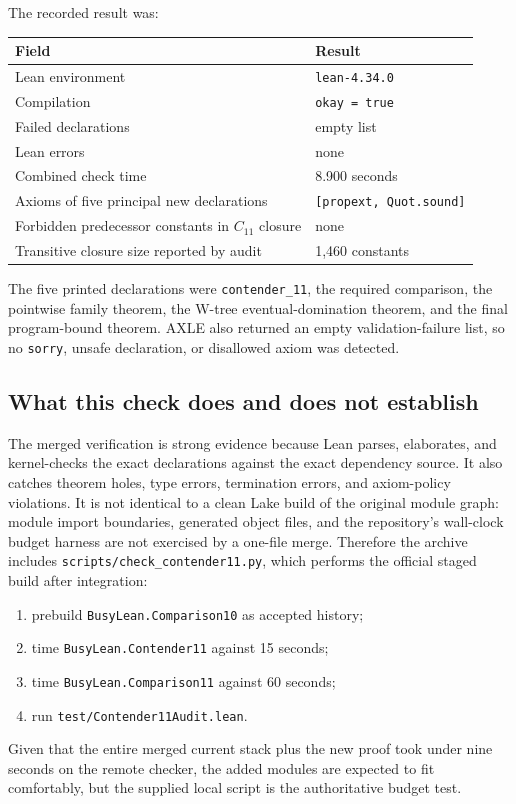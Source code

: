 \documentclass[11pt]{article}
\theoremstyle{definition}
\theoremstyle{remark}
\newcommand{\Celeven}{C_{11}}
\newcommand{\lean}[1]{\texttt{#1}}
\begin{document}
The recorded result was:
\begin{center}
\begin{tabular}{@{}ll@{}}
\toprule
Field & Result \\
\midrule
Lean environment & \lean{lean-4.34.0} \\
Compilation & \lean{okay = true} \\
Failed declarations & empty list \\
Lean errors & none \\
Combined check time & 8.900 seconds \\
Axioms of five principal new declarations & \lean{[propext, Quot.sound]} \\
Forbidden predecessor constants in $\Celeven$ closure & none \\
Transitive closure size reported by audit & 1,460 constants \\
\bottomrule
\end{tabular}
\end{center}

The five printed declarations were \lean{contender\_11}, the required comparison,
the pointwise family theorem, the W-tree eventual-domination theorem, and the
final program-bound theorem.  AXLE also returned an empty validation-failure
list, so no \lean{sorry}, unsafe declaration, or disallowed axiom was detected.

\subsection{What this check does and does not establish}

The merged verification is strong evidence because Lean parses, elaborates, and
kernel-checks the exact declarations against the exact dependency source.  It
also catches theorem holes, type errors, termination errors, and axiom-policy
violations.  It is not identical to a clean Lake build of the original module
graph: module import boundaries, generated object files, and the repository's
wall-clock budget harness are not exercised by a one-file merge.  Therefore the
archive includes \lean{scripts/check\_contender11.py}, which performs the official
staged build after integration:
\begin{enumerate}[leftmargin=*]
\item prebuild \lean{BusyLean.Comparison10} as accepted history;
\item time \lean{BusyLean.Contender11} against 15 seconds;
\item time \lean{BusyLean.Comparison11} against 60 seconds;
\item run \lean{test/Contender11Audit.lean}.
\end{enumerate}
Given that the entire merged current stack plus the new proof took under nine
seconds on the remote checker, the added modules are expected to fit comfortably,
but the supplied local script is the authoritative budget test.
\end{document}
